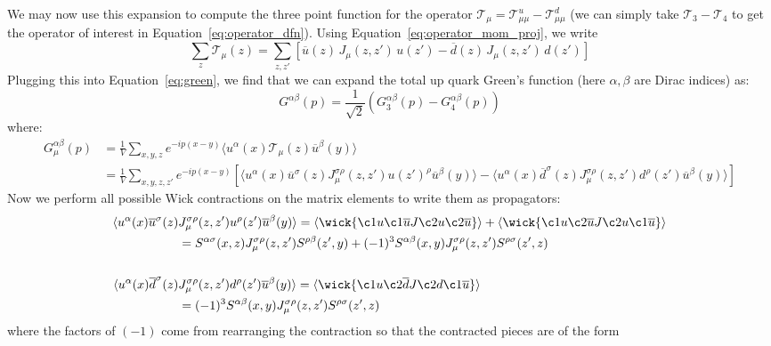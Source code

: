 \documentclass[11pt, oneside]{article}   	%
\theoremstyle{definition}
\begin{document}
We may now use this expansion to compute the three point function for the operator $\mathcal T_\mu = 
\mathcal T^u_{\mu\mu} - \mathcal T^d_{\mu\mu}$ (we can simply take $\mathcal T_3 - \mathcal T_4$ to get the operator of 
interest in Equation~\ref{eq:operator_dfn}). Using Equation~\ref{eq:operator_mom_proj}, we write 
\begin{equation}
	\sum_z \mathcal T_\mu(z) = \sum_{z, z'}\left[\overline u(z)\, J_\mu(z, z')\, u(z') - \overline d(z)\, J_\mu(z, z')\, d(z')\right]
\end{equation}
Plugging this into Equation~\ref{eq:green}, we find that we can expand the total up quark Green's function (here $\alpha, 
\beta$ are Dirac indices) as:
\begin{equation}
	G^{\alpha\beta}(p) = \frac{1}{\sqrt 2}\left(G_3^{\alpha\beta}(p) - G_4^{\alpha\beta} (p)\right)
\end{equation}
where:
\begin{align}
	G_\mu^{\alpha\beta}(p) &= \frac{1}{V}\sum_{x, y, z} e^{-ip(x - y)}\langle u^\alpha(x)\mathcal T_\mu(z) \overline u^\beta(y)
	\rangle \\
	&= \frac{1}{V}\sum_{x, y, z, z'} e^{-ip(x - y)}\left[\langle u^\alpha(x)\overline u^\sigma(z) J_\mu^{\sigma\rho}(z, z') 
	u(z')^\rho\overline u^\beta(y)\rangle - \langle u^\alpha(x)\overline d^\sigma(z) J_\mu^{\sigma\rho}(z, z') d^\rho(z') 
	\overline u^\beta(y)\rangle 
	\right]
\end{align}
Now we perform all possible Wick contractions on the matrix elements to write them as propagators:
\begin{align}
	\langle u^\alpha(x)\overline u^\sigma(z) &J_\mu^{\sigma\rho}(z, z') u^\rho(z')\overline u^\beta(y)\rangle = 
	\langle \wick{
		\c1 u \c1{\overline u} J \c2 u \c2{\overline u}
	} \rangle + \langle \wick{
		\c1 u \c2{\overline u} J \c2 u \c1{\overline u} 
	} \rangle \nonumber \\ 
	&= S^{\alpha\sigma}(x, z) J^{\sigma\rho}_\mu(z, z') S^{\rho\beta}(z', y) + (-1)^3 S^{\alpha\beta}(x, y) 
	J^{\sigma\rho}_\mu(z, z')S^{\rho\sigma}(z', z) \\
	\nonumber\\
	\langle u^\alpha(x)\overline d^\sigma(z) &J_\mu^{\sigma\rho}(z, z') d^\rho(z') \overline u^\beta(y)\rangle = 
	\langle \wick{
		\c1 u \c2{\overline d} J \c2 d \c1{\overline u}
	}\rangle\nonumber \\ 
	&= (-1)^3 S^{\alpha\beta}(x, y) J^{\sigma\rho}_\mu(z, z')S^{\rho\sigma}(z', z)
\end{align}
where the factors of $(-1)$ come from rearranging the contraction so that the contracted pieces are of the form 
\end{document}
